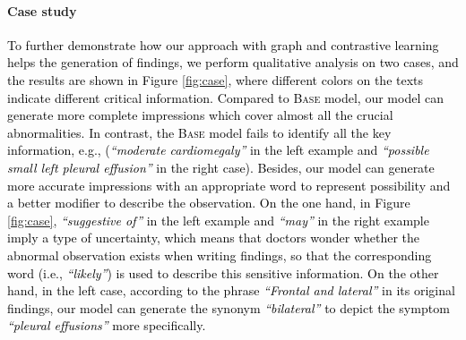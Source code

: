 \documentclass[11pt]{article}
\begin{document}
\paragraph{Case study}
\textcolor{black}{
To further demonstrate how our approach with graph and contrastive learning helps the generation of findings, we perform qualitative analysis on two cases, and the results are shown in Figure \ref{fig:case}, where different colors on the texts indicate different critical information.
%
Compared to \textsc{Base} model, our model can generate more complete impressions which cover almost all the crucial abnormalities. In contrast, the \textsc {Base} model fails to identify all the key information, e.g., (\textit{``moderate cardiomegaly''} in the left example and \textit{``possible small left pleural effusion''} in the right case).
%
Besides, our model can generate more accurate impressions with an appropriate word to represent possibility and a better modifier to describe the observation.
%
On the one hand, in Figure \ref{fig:case}, \textit{``suggestive of''} in the left example and \textit{``may''} in the right example imply a type of uncertainty, which means that doctors wonder whether the abnormal observation exists when writing findings, so that the corresponding word (i.e., \textit{``likely''}) is used to describe this sensitive information.
%
On the other hand, in the left case, according to the phrase \textit{``Frontal and lateral''} in its original findings, our model can generate the synonym \textit{``bilateral''} to depict the symptom \textit{``pleural effusions''} more specifically.
%
}
\end{document}
